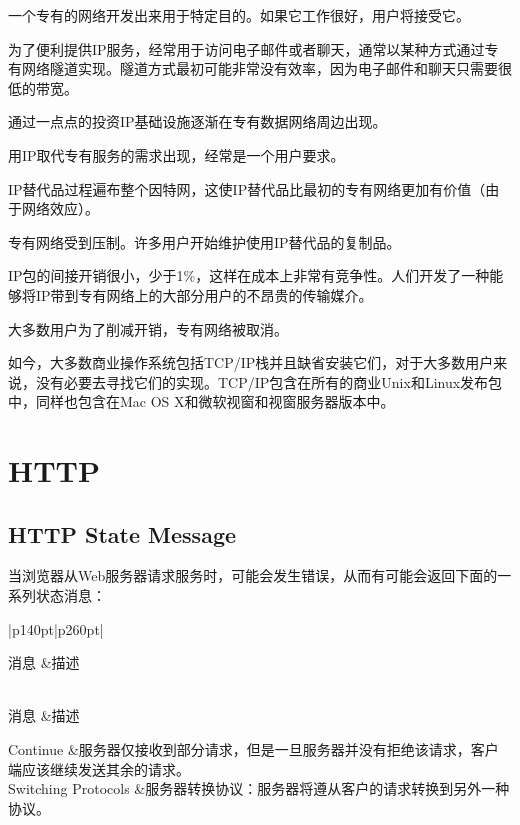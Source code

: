 \begin{compactenum}
\item 一个专有的网络开发出来用于特定目的。如果它工作很好，用户将接受它。
\item 为了便利提供IP服务，经常用于访问电子邮件或者聊天，通常以某种方式通过专有网络隧道实现。隧道方式最初可能非常没有效率，因为电子邮件和聊天只需要很低的带宽。
\item 通过一点点的投资IP基础设施逐渐在专有数据网络周边出现。
\item 用IP取代专有服务的需求出现，经常是一个用户要求。
\item IP替代品过程遍布整个因特网，这使IP替代品比最初的专有网络更加有价值（由于网络效应）。
\item 专有网络受到压制。许多用户开始维护使用IP替代品的复制品。
\item IP包的间接开销很小，少于1\%，这样在成本上非常有竞争性。人们开发了一种能够将IP带到专有网络上的大部分用户的不昂贵的传输媒介。
\item 大多数用户为了削减开销，专有网络被取消。
\end{compactenum}

如今，大多数商业操作系统包括TCP/IP栈并且缺省安装它们，对于大多数用户来说，没有必要去寻找它们的实现。TCP/IP包含在所有的商业Unix和Linux发布包中，同样也包含在Mac OS X和微软视窗和视窗服务器版本中。





















\chapter{HTTP}



\section{HTTP State Message}


当浏览器从Web服务器请求服务时，可能会发生错误，从而有可能会返回下面的一系列状态消息：


\begin{longtable}{|p{140pt}|p{260pt}|}

\tabularnewline\hline
消息			&描述		
\endhead

\caption{1xx: 信息}\\
\hline
消息			&描述
\endfirsthead


\endfoot


\endlastfoot

 Continue				&服务器仅接收到部分请求，但是一旦服务器并没有拒绝该请求，客户端应该继续发送其余的请求。\\
 Switching Protocols	&服务器转换协议：服务器将遵从客户的请求转换到另外一种协议。							\\
\hline
\end{longtable}



